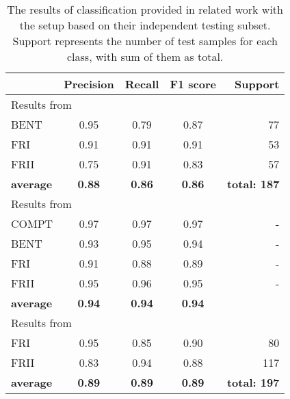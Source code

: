 \documentclass[fleqn,usenatbib]{mnras}
\begin{document}
\begin{table}
\centering
\caption{The results of classification provided in related work with the setup based on their independent testing subset. Support represents the number of test samples for each class, with sum of them as total.}
\label{table_sota}
\begin{tabular}{lcccr}
\hline
                 & \textbf{Precision} & \textbf{Recall} & \textbf{F1 score} &  \textbf{Support}\\ \hline
                 \multicolumn{5}{l}{Results from \cite{3}}                                                       \\ \hline
BENT             & 0.95              & 0.79                & 0.87              & 77             \\ 
FRI              & 0.91              & 0.91                & 0.91              & 53             \\ 
FRII             & 0.75              & 0.91                & 0.83             & 57             \\ \hline
\textbf{average}   & \textbf{0.88}     & \textbf{0.86}       & \textbf{0.86}             & \textbf{total: 187}           \\ \hline

\multicolumn{5}{l}{Results from \cite{Lukic_2018}}                                                       \\ \hline
COMPT            & 0.97              & 0.97                & 0.97              & -           \\ 
BENT             & 0.93              & 0.95                & 0.94              & -           \\ 
FRI              & 0.91              & 0.88                & 0.89             & -           \\ 
FRII             & 0.95              & 0.96                & 0.95             & -          \\ \hline
\textbf{average}  & \textbf{0.94}     & \textbf{0.94}       & \textbf{0.94}             & \textbf{}         \\ \hline

\multicolumn{5}{l}{Results from \cite{1}}                                                       \\ \hline
FRI              & 0.95              & 0.85                & 0.90              & 80             \\ 
FRII             & 0.83              & 0.94                & 0.88              & 117            \\ \hline
\textbf{average} & \textbf{0.89}     & \textbf{0.89}       & \textbf{0.89}             & \textbf{total: 197}            \\ \hline
\end{tabular}
\end{table}
\end{document}
